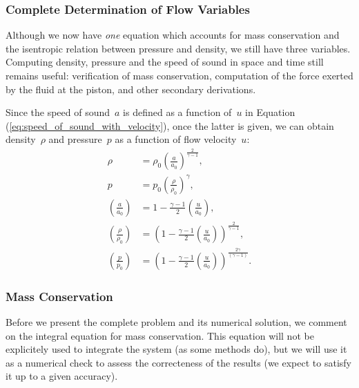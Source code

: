 \documentclass[../../thesis.tex]{subfiles}
\begin{document}
\subsubsection{Complete Determination of Flow Variables}
Although we now have \textit{one} equation which accounts for mass conservation and the isentropic relation between pressure and density, we still have three variables. 
Computing density, pressure and the speed of sound in space and time still remains useful: 
verification of mass conservation, computation of the force exerted by the fluid at the piston, and other secondary derivations.

Since the speed of sound~$a$ is defined as a function of~$u$ in Equation (\ref{eq:speed_of_sound_with_velocity}),
once the latter is given, we can obtain density~$\rho$ and pressure~$p$ as a function of flow velocity~$u$:
\begin{subequations}
    \begin{align}
        \rho &= \rho_0 \left(\frac{a}{a_0}\right)^{\frac{2}{\gamma-1}},
        \\
        p    &= p_0 \left(\frac{\rho}{\rho_0}\right)^{\gamma},
        \\[2mm]
        \left(\frac{a}{a_0}\right) &= 1 - \frac{\gamma-1}{2}\left(\frac{u}{a_0}\right), 
        \\[2mm]
        \left(\frac{\rho}{\rho_0}\right) &= \left(1 - \frac{\gamma-1}{2}\left(\frac{u}{a_0}\right)\right)^{\frac{2}{\gamma-1}},
        \label{eq:density_as_a_function_of_speed}
        \\[2mm]
        \left(\frac{p}{p_0}\right) &= \left(1 - \frac{\gamma-1}{2}\left(\frac{u}{a_0}\right)\right)^{\frac{2\gamma}{\left(\gamma-1\right)}}.
    \end{align}
\end{subequations}

\subsubsection{Mass Conservation}
\label{sec:mass_conservation_definition}
Before we present the complete problem and its numerical solution, we comment 
on the integral equation for mass conservation.
This equation will not be explicitely used to integrate the system
(as some methods do), 
but we will use it as a numerical check 
to assess the correcteness of the results
(we expect to satisfy it up to a given accuracy).
\end{document}
